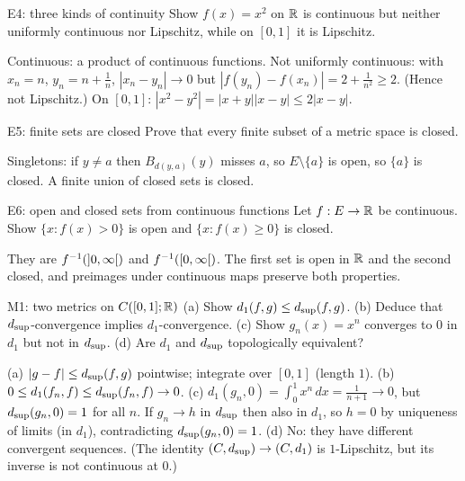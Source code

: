 \begin{exam}{E4: three kinds of continuity}
Show $f(x)=x^2$ on $\mathbb R$ is continuous but neither uniformly continuous nor Lipschitz, while on
$[0,1]$ it is Lipschitz.
\end{exam}
\begin{answer}
Continuous: a product of continuous functions. Not uniformly continuous: with $x_n=n$,
$y_n=n+\frac1n$, $|x_n-y_n|\to0$ but $|f(y_n)-f(x_n)|=2+\frac1{n^2}\ge2$. (Hence not Lipschitz.)
On $[0,1]$: $|x^2-y^2|=|x+y||x-y|\le2|x-y|$.
\end{answer}

\begin{exam}{E5: finite sets are closed}
Prove that every finite subset of a metric space is closed.
\end{exam}
\begin{answer}
Singletons: if $y\ne a$ then $B_{d(y,a)}(y)$ misses $a$, so $E\setminus\{a\}$ is open, so $\{a\}$
is closed. A finite union of closed sets is closed.
\end{answer}

\begin{exam}{E6: open and closed sets from continuous functions}
Let $f:E\to\mathbb R$ be continuous. Show $\{x:f(x)>0\}$ is open and $\{x:f(x)\ge0\}$ is closed.
\end{exam}
\begin{answer}
They are $f^{-1}(\mathopen{]}0,\infty\mathclose{[})$ and $f^{-1}(\mathopen{[}0,\infty\mathclose{[})$. The first set is open in $\mathbb R$ and the
second closed, and preimages under continuous maps preserve both properties.
\end{answer}


\begin{exam}{M1: two metrics on $C([0,1];\mathbb R)$}
(a) Show $d_1(f,g)\le d_{\sup}(f,g)$. (b) Deduce that $d_{\sup}$-convergence implies $d_1$-convergence.
(c) Show $g_n(x)=x^n$ converges to $0$ in $d_1$ but not in $d_{\sup}$. (d) Are $d_1$ and $d_{\sup}$
topologically equivalent?
\end{exam}
\begin{answer}
(a) $|g-f|\le d_{\sup}(f,g)$ pointwise; integrate over $[0,1]$ (length $1$).
(b) $0\le d_1(f_n,f)\le d_{\sup}(f_n,f)\to0$.
(c) $d_1(g_n,0)=\int_0^1x^n\,dx=\frac1{n+1}\to0$, but $d_{\sup}(g_n,0)=1$ for all $n$. If $g_n\to h$
in $d_{\sup}$ then also in $d_1$, so $h=0$ by uniqueness of limits (in $d_1$), contradicting
$d_{\sup}(g_n,0)=1$.
(d) No: they have different convergent sequences. (The identity $(C,d_{\sup})\to(C,d_1)$ is
$1$-Lipschitz, but its inverse is not continuous at $0$.)
\end{answer}

